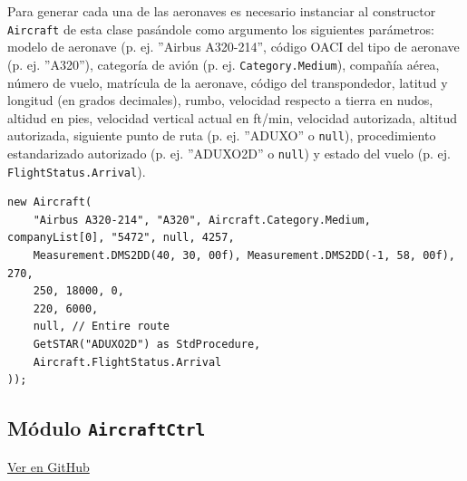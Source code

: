 Para generar cada una de las aeronaves es necesario instanciar al constructor \texttt{Aircraft} de esta clase pasándole como argumento los siguientes parámetros: modelo de aeronave (p. ej. ''Airbus A320-214'', código OACI del tipo de aeronave (p. ej. ''A320''), categoría de avión (p. ej. \texttt{Category.Medium}), compañía aérea, número de vuelo, matrícula de la aeronave, código del transpondedor, latitud y longitud (en grados decimales), rumbo, velocidad respecto a tierra en nudos, altidud en pies, velocidad vertical actual en ft/min, velocidad autorizada, altitud autorizada, siguiente punto de ruta (p. ej. ''ADUXO'' o \texttt{null}), procedimiento estandarizado autorizado (p. ej. ''ADUXO2D'' o \texttt{null}) y estado del vuelo (p. ej. \texttt{FlightStatus.Arrival}).


\begin{table}[!hbtp]
	\caption{Ejemplo de instancia al constructor de la clase \texttt{Aircraft}.}
	\label{tab:EjemploAircraft}
\end{table}
\vspace{-0.8cm}
\begin{scriptsize}
\begin{Verbatim}[frame=single]
new Aircraft(
    "Airbus A320-214", "A320", Aircraft.Category.Medium, companyList[0], "5472", null, 4257,
    Measurement.DMS2DD(40, 30, 00f), Measurement.DMS2DD(-1, 58, 00f), 270,
    250, 18000, 0,
    220, 6000,
    null, // Entire route
    GetSTAR("ADUXO2D") as StdProcedure,
    Aircraft.FlightStatus.Arrival
));
\end{Verbatim}
\end{scriptsize}





\clearpage

\subsection{Módulo \texttt{AircraftCtrl}}
\label{subsec:ClaseAircraftCtrl}

\vspace{-0.85cm}
\begin{flushright}
\href{https://github.com/macgyver912/atc-simulator/blob/jaime/Assets/Scripts/aircrafts/AircraftCtrl.cs}{Ver en GitHub \faGithub}
\end{flushright}

